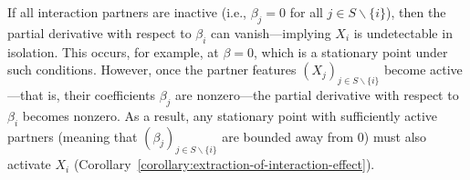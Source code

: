 \documentclass[sn-mathphys-num]{sn-jnl}%
\numberwithin{equation}{section}
\theoremstyle{thmstyleone}%
\theoremstyle{thmstyletwo}%
\theoremstyle{thmstylethree}%
\begin{document}
\begin{itemize}
If all interaction partners are inactive (i.e., $\beta_j = 0$ for all $j \in S \backslash \{i\}$), then the partial derivative with respect to $\beta_i$ can vanish---implying $X_i$ is undetectable in isolation. This occurs, for example, at $\beta = 0$, which is a stationary point under such conditions. However, once the partner features $(X_j)_{j \in S \backslash \{i\}}$ become active---that is, their coefficients $\beta_j$ are nonzero---the partial derivative with respect to $\beta_i$ becomes nonzero. As a result, any stationary point with sufficiently active partners (meaning that $(\beta_j)_{j \in S \backslash \{i\}}$ are bounded away from $0$) must also activate $X_i$ (Corollary~\ref{corollary:extraction-of-interaction-effect}).
%
\end{itemize} 

\vspace{.5em} 
\end{document}
